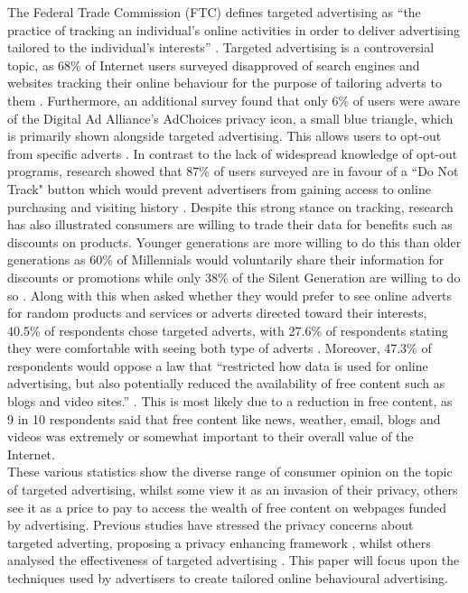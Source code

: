 \documentclass[12pt]{article}
\begin{document}
The Federal Trade Commission (FTC) defines targeted advertising as ``the practice of tracking an individual’s online activities in order to deliver advertising tailored to the individual’s interests'' \parencite{comission2009}. Targeted advertising is a controversial topic, as 68\% of Internet users surveyed disapproved of search engines and websites tracking their online behaviour for the purpose of tailoring adverts to them \parencite{usersTA}. Furthermore, an additional survey found that only 6\% of users were aware of the Digital Ad Alliance's AdChoices privacy icon, a small blue triangle, which is primarily shown alongside targeted advertising. This allows users to opt-out from specific adverts \parencite{AdChoices}. In contrast to the lack of widespread knowledge of opt-out programs, research showed that 87\% of users surveyed are in favour of a ``Do Not Track" button which would prevent advertisers from gaining access to online purchasing and visiting history \parencite{dnt87}. Despite this strong stance on tracking, research has also illustrated consumers are willing to trade their data for benefits such as discounts on products. Younger generations are more willing to do this than older generations as 60\% of Millennials would voluntarily share their information for discounts or promotions while only 38\% of the Silent Generation are willing to do so \parencite{dnt87}. Along with this when asked whether they would prefer to see online adverts for random products and services or adverts directed toward their interests, 40.5\% of respondents chose targeted adverts, with 27.6\% of respondents stating they were comfortable with seeing both type of adverts \parencite{randomAds}. Moreover, 47.3\% of respondents would oppose a law that ``restricted how data is used for online advertising, but also potentially reduced the availability of free content such as blogs and video sites.” \parencite{randomAds}. This is most likely due to a reduction in free content, as 9 in 10 respondents said that free content like news, weather, email, blogs and videos was extremely or somewhat important to their overall value of the Internet. \\

These various statistics show the diverse range of consumer opinion on the topic of targeted advertising, whilst some view it as an invasion of their privacy, others see it as a price to pay to access the wealth of free content on webpages funded by advertising. Previous studies have stressed the privacy concerns about targeted adverting, proposing a privacy enhancing framework \parencite{wang2015privacy}, whilst others analysed the effectiveness of targeted advertising \parencite{brahim2011targeted}. This paper will focus upon the techniques used by  advertisers to create tailored online behavioural advertising. \\
\end{document}
